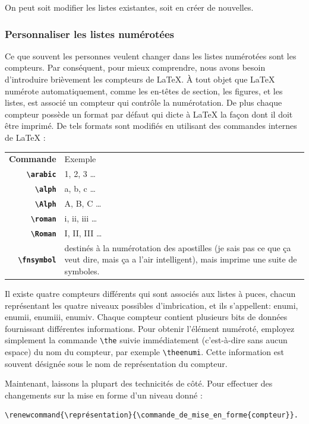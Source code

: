 \documentclass[a4paper,twoside]{article}
\begin{document}
On peut soit modifier les listes existantes, soit en créer de nouvelles.

\subsubsection{Personnaliser les listes numérotées}
Ce que souvent les personnes veulent changer dans les listes numérotées sont les compteurs. Par conséquent, pour mieux comprendre, nous avons besoin d'introduire brièvement les compteurs de \LaTeX. À tout objet que \LaTeX{} numérote automatiquement, comme les en-têtes de section, les figures, et les listes, est associé un compteur qui contrôle la numérotation. De plus chaque compteur possède un format par défaut qui dicte à \LaTeX{} la façon dont il doit être imprimé. De tels formats sont modifiés en utilisant des commandes internes de \LaTeX{} :

\begin{tabular}{>{\bfseries}r<{}@{ : }p{11cm}}
Commande &	Exemple\\
\verb|\arabic| & 1, 2, 3 \ldots\\
\verb|\alph| &	a, b, c \ldots\\
\verb|\Alph| &	A, B, C \ldots\\
\verb|\roman| &	i, ii, iii \ldots\\
\verb|\Roman| &	I, II, III \ldots\\
\verb|\fnsymbol| &	destinés à la numérotation des apostilles (je sais pas ce que ça veut dire, mais ça a l'air intelligent), mais imprime une suite de symboles.
\end{tabular}


Il existe quatre compteurs différents qui sont associés aux listes à puces, chacun représentant les quatre niveaux possibles d'imbrication, et ils s'appellent: enumi, enumii, enumiii, enumiv. Chaque compteur contient plusieurs bits de données fournissant différentes informations. Pour obtenir l'élément numéroté, employez simplement la commande \verb|\the| suivie immédiatement (c'est-à-dire sans aucun espace) du nom du compteur, par exemple \verb|\theenumi|. Cette information est souvent désignée sous le nom de représentation du compteur.

Maintenant, laissons la plupart des technicités de côté. Pour effectuer des changements sur la mise en forme d'un niveau donné :

\begin{verbatim}
\renewcommand{\représentation}{\commande_de_mise_en_forme{compteur}}.
\end{verbatim}
\end{document}
